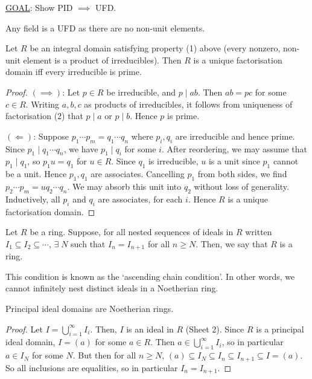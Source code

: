 \underline{GOAL}: Show PID $\implies$ UFD.

\begin{remark}
	Any field is a UFD as there are no non-unit elements.
\end{remark} 

\begin{proposition} \label{prp:10.6}
	Let $R$ be an integral domain satisfying property (1) above (every nonzero, non-unit element is a product of irreducibles).
	Then $R$ is a unique factorisation domain iff every irreducible is prime.
\end{proposition}

\begin{proof}
	$(\implies)$: Let $p \in R$ be irreducible, and $p \mid ab$.
	Then $ab = pc$ for some $c \in R$.
	Writing $a, b, c$ as products of irreducibles, it follows from uniqueness of factorisation (2) that $p \mid a$ or $p \mid b$.
	Hence $p$ is prime.

	$(\Longleftarrow)$: Suppose $p_1 \cdots p_m = q_1 \cdots q_n$ where $p_i, q_i$ are irreducible and hence prime.
	Since $p_1 \mid q_1 \cdots q_n$, we have $p_1 \mid q_i$ for some $i$.
	After reordering, we may assume that $p_1 \mid q_1$, so $p_1 u = q_1$ for $u \in R$.
	Since $q_1$ is irreducible, $u$ is a unit since $p_1$ cannot be a unit.
	Hence $p_1, q_1$ are associates.
	Cancelling $p_1$ from both sides, we find $p_2 \cdots p_m = u q_2 \cdots q_n$.
	We may absorb this unit into $q_2$ without loss of generality.
	Inductively, all $p_i$ and $q_i$ are associates, for each $i$.
	Hence $R$ is a unique factorisation domain.
\end{proof}

\begin{definition}[Noetherian]
	Let $R$ be a ring.
	Suppose, for all nested sequences of ideals in $R$ written $I_1 \subseteq I_2 \subseteq \cdots$, $\exists \; N$ such that $I_n = I_{n+1}$ for all $n \geq N$.
	Then, we say that $R$ is a  ring.
\end{definition}

This condition is known as the `ascending chain condition'.
In other words, we cannot infinitely nest distinct ideals in a Noetherian ring.

\begin{lemma} \label{lem:10.7}
	Principal ideal domains are Noetherian rings.
\end{lemma}

\begin{proof}
	Let $I = \bigcup_{i=1}^\infty I_i$.
	Then, $I$ is an ideal in $R$ (Sheet 2).
	Since $R$ is a principal ideal domain, $I = (a)$ for some $a \in R$.
	Then $a \in \bigcup_{i=1}^\infty I_i$, so in particular $a \in I_N$ for some $N$.
	But then for all $n \geq N$, $(a) \subseteq I_N \subseteq I_{n} \subseteq I_{n+1} \subseteq I = (a)$.
	So all inclusions are equalities, so in particular $I_n = I_{n+1}$.
\end{proof}

